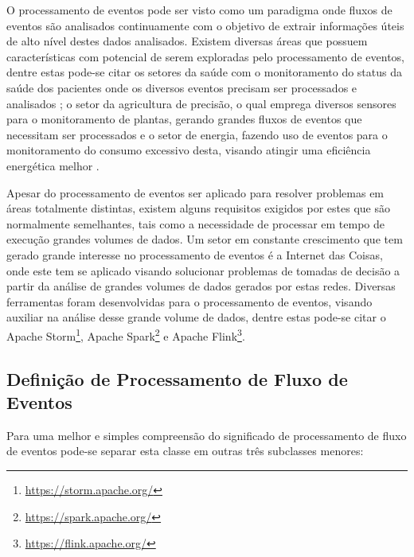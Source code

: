 \documentclass[ti,table]{texufpel} %
\begin{document}
O processamento de eventos pode ser visto como um paradigma onde fluxos de eventos são analisados continuamente com o objetivo de extrair informações úteis de alto nível destes dados analisados. Existem diversas áreas que possuem características com potencial de serem exploradas pelo processamento de eventos, dentre estas pode-se citar os setores da saúde com o monitoramento do status da saúde dos pacientes onde os diversos eventos precisam ser processados e analisados \cite{weiner2008health}; o setor da agricultura de precisão, o qual emprega diversos sensores para o monitoramento de plantas, gerando grandes fluxos de eventos que necessitam ser processados \cite{garcia2011wireless} e o setor de energia, fazendo uso de eventos para o monitoramento do consumo excessivo desta, visando atingir uma eficiência energética melhor \cite{vijayaraghavan2010automated}.  

  

Apesar do processamento de eventos ser aplicado para resolver problemas em áreas totalmente distintas, existem alguns requisitos exigidos por estes que são normalmente semelhantes, tais como a necessidade de processar em tempo de execução grandes volumes de dados. Um setor em constante  crescimento que tem gerado grande interesse no processamento de eventos é a Internet das Coisas, onde este tem se aplicado visando solucionar problemas de tomadas de decisão a partir da análise de grandes volumes de dados gerados por estas redes. Diversas ferramentas foram desenvolvidas para o processamento de eventos, visando auxiliar na análise desse grande volume de dados, dentre estas pode-se citar o Apache Storm\footnote{\url{https://storm.apache.org/}}, Apache Spark\footnote{\url{https://spark.apache.org/}} e Apache Flink\footnote{\url{https://flink.apache.org/}}. 

  

\subsection{Definição de Processamento de Fluxo de Eventos} 

  

Para uma melhor e simples compreensão do significado de processamento de fluxo de eventos pode-se separar esta classe em outras três subclasses menores: 

\end{document}
